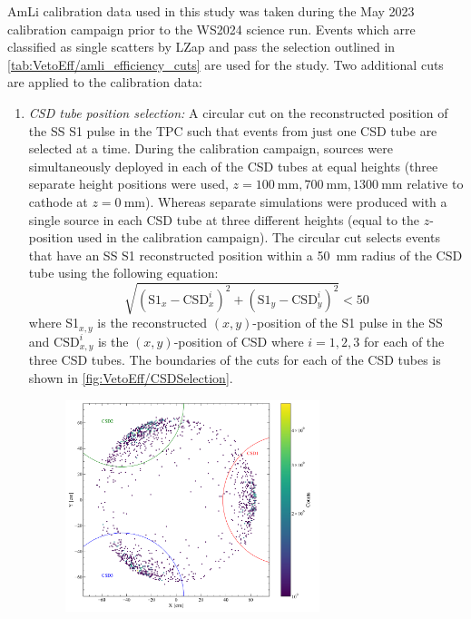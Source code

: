 AmLi calibration data used in this study was taken during the May 2023 calibration campaign prior to the WS2024 science run. Events which arre classified as single scatters by LZap and pass the selection outlined in \autoref{tab:VetoEff/amli_efficiency_cuts} are used for the study. Two additional cuts are applied to the calibration data:
\begin{enumerate}
	\item \textit{CSD tube position selection:} A circular cut on the reconstructed position of the SS S1 pulse in the TPC such that events from just one CSD tube are selected at a time. During the calibration campaign, sources were simultaneously deployed in each of the CSD tubes at equal heights (three separate height positions were used, $z=100~\text{mm},700~\text{mm},1300~\text{mm}$ relative to cathode at $z=0~\text{mm}$). Whereas separate simulations were produced with a single source in each CSD tube at three different heights (equal to the $z$-position used in the calibration campaign). 
    The circular cut selects events that have an SS S1 reconstructed position within a 50~mm radius of the CSD tube using the following equation:
    \begin{equation}\label{eqn:VetoEff/CSDSelection}
        \sqrt{(\text{S1}_x-\text{CSD}_x^i)^2+(\text{S1}_y-\text{CSD}_y^i)^2}<50
    \end{equation}
    where S1$_{x,y}$ is the reconstructed $(x,y)$-position of the S1 pulse in the SS and $\text{CSD}_{x,y}^i$ is the $(x,y)$-position of CSD where $i=1,2,3$ for each of the three CSD tubes.
    The boundaries of the cuts for each of the CSD tubes is shown in \autoref{fig:VetoEff/CSDSelection}. 
    \begin{figure}[!ht]
    \centering
        \includegraphics[width=0.7\textwidth]{figures/VetoEfficiency/CircularCSDCut.pdf}

\end{figure}
\end{enumerate}
